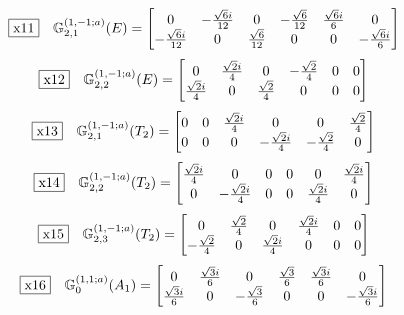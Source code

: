 \documentclass[fleqn,10pt,landscape]{jsarticle}
\begin{document}
\begin{dmath*}
\fbox{x11}\quad \mathbb{G}_{2,1}^{(1,-1;a)}(E)=\begin{bmatrix} 0 & - \frac{\sqrt{6} i}{12} & 0 & - \frac{\sqrt{6}}{12} & \frac{\sqrt{6} i}{6} & 0 \\ - \frac{\sqrt{6} i}{12} & 0 & \frac{\sqrt{6}}{12} & 0 & 0 & - \frac{\sqrt{6} i}{6} \end{bmatrix}
\end{dmath*}
\begin{dmath*}
\fbox{x12}\quad \mathbb{G}_{2,2}^{(1,-1;a)}(E)=\begin{bmatrix} 0 & \frac{\sqrt{2} i}{4} & 0 & - \frac{\sqrt{2}}{4} & 0 & 0 \\ \frac{\sqrt{2} i}{4} & 0 & \frac{\sqrt{2}}{4} & 0 & 0 & 0 \end{bmatrix}
\end{dmath*}
\begin{dmath*}
\fbox{x13}\quad \mathbb{G}_{2,1}^{(1,-1;a)}(T_{2})=\begin{bmatrix} 0 & 0 & \frac{\sqrt{2} i}{4} & 0 & 0 & \frac{\sqrt{2}}{4} \\ 0 & 0 & 0 & - \frac{\sqrt{2} i}{4} & - \frac{\sqrt{2}}{4} & 0 \end{bmatrix}
\end{dmath*}
\begin{dmath*}
\fbox{x14}\quad \mathbb{G}_{2,2}^{(1,-1;a)}(T_{2})=\begin{bmatrix} \frac{\sqrt{2} i}{4} & 0 & 0 & 0 & 0 & \frac{\sqrt{2} i}{4} \\ 0 & - \frac{\sqrt{2} i}{4} & 0 & 0 & \frac{\sqrt{2} i}{4} & 0 \end{bmatrix}
\end{dmath*}
\begin{dmath*}
\fbox{x15}\quad \mathbb{G}_{2,3}^{(1,-1;a)}(T_{2})=\begin{bmatrix} 0 & \frac{\sqrt{2}}{4} & 0 & \frac{\sqrt{2} i}{4} & 0 & 0 \\ - \frac{\sqrt{2}}{4} & 0 & \frac{\sqrt{2} i}{4} & 0 & 0 & 0 \end{bmatrix}
\end{dmath*}
\begin{dmath*}
\fbox{x16}\quad \mathbb{G}_{0}^{(1,1;a)}(A_{1})=\begin{bmatrix} 0 & \frac{\sqrt{3} i}{6} & 0 & \frac{\sqrt{3}}{6} & \frac{\sqrt{3} i}{6} & 0 \\ \frac{\sqrt{3} i}{6} & 0 & - \frac{\sqrt{3}}{6} & 0 & 0 & - \frac{\sqrt{3} i}{6} \end{bmatrix}
\end{dmath*}
\end{document}
